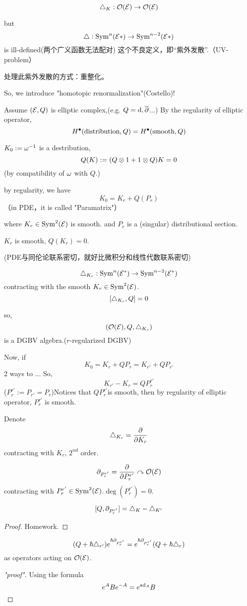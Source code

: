 $$\triangle_K:\mathcal{O}(\mathcal{E})\to\mathcal{O}(\mathcal{E})$$

but
$$\triangle:\operatorname{Sym}^n(\mathcal{E}*)\to\operatorname{Sym}^{n-2}(\mathcal{E}*)$$
is ill-defined(两个广义函数无法配对)
这个不良定义，即“紫外发散”.（UV-problem）

处理此紫外发散的方式：重整化。

So, we introduce "homotopic renormalization"(Costello)!

Assume $(\mathcal{E},Q)$ is elliptic complex,(e.g. $Q=\mathrm{d},\overline{\partial}$...)
By the regularity of elliptic operator,
$$H^{\bullet}(\text{distribution},Q)=H^{\bullet}(\text{smooth},Q)$$

$K_0:=\omega^{-1}$ is a destribution,
$$Q(K):=(Q\otimes 1+ 1\otimes Q)K=0$$
(by compatibility of $\omega$ with $Q$.)

by regularity, we have
$$K_0=K_r+Q(P_r)$$
（in PDE，it is called "Paramatrix"）

where $K_r\in\operatorname{Sym}^2(\mathcal{E})$ is smooth.
and $P_r$ is a (singular) distributional section.

$K_r$ is smooth, $Q(K_r)=0$.

{\color{blue}
(PDE与同伦论联系密切，就好比微积分和线性代数联系密切)
}

$$\triangle_{K_r}:\operatorname{Sym}^n(\mathcal{E}^*)\to\operatorname{Sym}^{n-2}(\mathcal{E}^*)$$
contracting with the smooth $K_r\in\operatorname{Sym}^2(\mathcal{E})$.
$$[\triangle_{K_r},Q]=0$$

so,
$$(\mathcal{O}(\mathcal{E}),Q,\triangle_{K_r})$$
is a DGBV algebra.($r$-regularized DGBV)

Now, if
$$K_0=K_r+QP_r=K_{r'}+QP_{r'}$$
2 ways to ...
So,
$$K_{r'}-K_r=QP^{r'}_r$$
($P_r^{r'}:=P_{r'}=P_r$)Notices that
$QP^{r'}_r$is smooth, then by regularity of elliptic operator,
$P^{r'}_r$ is smooth.

Denote
$$\triangle_{K_r}=\frac{\partial } {\partial K_r}$$
contracting with $K_r$, $2^{nd}$ order.

$$\partial_{P_r^{r'}}=\frac{\partial } {\partial P_r^{r'}}\curvearrowright\mathcal{O}(\mathcal{E})$$
contracting with $P_r^{r'}\in\operatorname{Sym}^2(\mathcal{E})$.$\deg(P_r^{r'})=0$.

\begin{lemma}
$$[Q,\partial_{P_r^{r'}}]=\triangle_{K}-\triangle_{K'}$$
\end{lemma}
\begin{proof}
Homework.
\end{proof}

\begin{cor}
$$(Q+\hbar\triangle_{r'})e^{\hbar\partial_{P_r^{r'}}}
=e^{\hbar\partial_{P^{r'}_r}}(Q+\hbar\triangle_r)
$$
as operators acting on $\mathcal{O}(\mathcal{E})$.
\end{cor}
\begin{proof}["proof"]
Using the formula
$$e^ABe^{-A}=e^{\operatorname{ad}_A}B$$
\end{proof}

